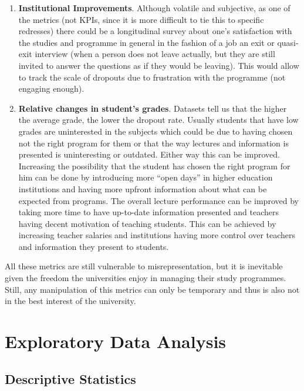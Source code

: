 \documentclass[
  letterpaper,
  DIV=11,
  numbers=noendperiod]{scrartcl}
\begin{document}
\begin{enumerate}
\def\labelenumi{\alph{enumi}.}
\item
  \textbf{Institutional Improvements}. Although volatile and subjective,
  as one of the metrics (not KPIs, since it is more difficult to tie
  this to specific redresses) there could be a longitudinal survey about
  one's satisfaction with the studies and programme in general in the
  fashion of a job an exit or quasi-exit interview (when a person does
  not leave actually, but they are still invited to answer the questions
  as if they would be leaving). This would allow to track the scale of
  dropouts due to frustration with the programme (not engaging enough).
\item
  \textbf{Relative changes in student's grades}. Datasets tell us that
  the higher the average grade, the lower the dropout rate. Usually
  students that have low grades are uninterested in the subjects which
  could be due to having chosen not the right program for them or that
  the way lectures and information is presented is uninteresting or
  outdated. Either way this can be improved. Increasing the possibility
  that the student has chosen the right program for him can be done by
  introducing more \enquote{open days} in higher education institutions
  and having more upfront information about what can be expected from
  programs. The overall lecture performance can be improved by taking
  more time to have up-to-date information presented and teachers having
  decent motivation of teaching students. This can be achieved by
  increasing teacher salaries and institutions having more control over
  teachers and information they present to students.
\end{enumerate}

All these metrics are still vulnerable to misrepresentation, but it is
inevitable given the freedom the universities enjoy in managing their
study programmes. Still, any manipulation of this metrics can only be
temporary and thus is also not in the best interest of the university.

\hypertarget{sec-eda}{%
\section{Exploratory Data Analysis}\label{sec-eda}}

\hypertarget{descriptive-statistics}{%
\subsection{Descriptive Statistics}\label{descriptive-statistics}}
\end{document}
